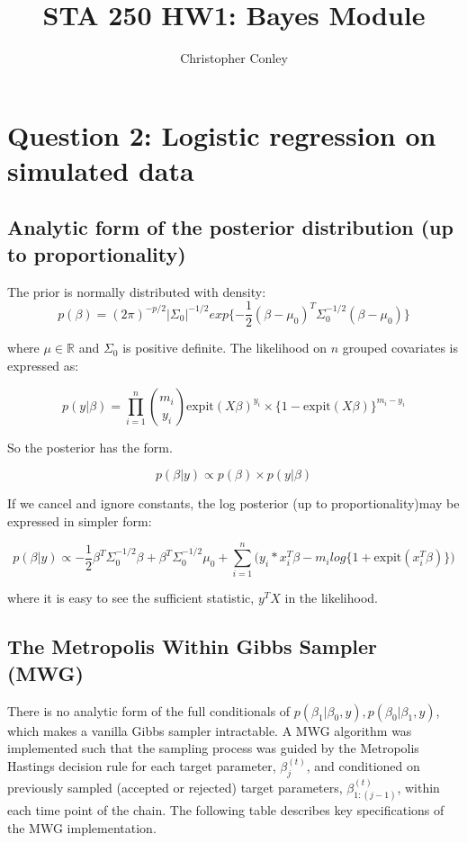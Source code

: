 \documentclass[11pt]{amsart}
\title{STA 250 HW1: Bayes Module}
\author{Christopher Conley}
\date{}                                           %
\begin{document}
\maketitle
\tableofcontents
\onehalfspacing

\section*{Question 2: Logistic regression on simulated data}
\subsection*{Analytic form of the posterior distribution (up to proportionality)}

The prior is normally distributed with density: 
\[ p( \beta)  = (2\pi)^{-p/2} |\Sigma_0| ^ {-1/2}  exp \{ -\frac{1}{2}  (\beta - \mu_0)^T \Sigma_0^{-1/2}  (\beta - \mu_0) \}\]

where $\mu \in \mathbb{R} $ and $\Sigma_0$ is positive definite. The likelihood on $n$ grouped covariates is expressed as:

\[ p( y | \beta ) = \prod_{i = 1}^n \binom{m_i}{y_i} \text{expit}( X \beta)^{y_i} \times \{1 - \text{expit}( X \beta) \}^{m_i - y_i} \]

So the posterior has the form.

\[ p( \beta | y) \propto p (\beta) \times p(y | \beta ) \]

If we cancel and ignore constants, the log posterior (up to proportionality)may be expressed in simpler form: 

\[ p( \beta | y) \propto -\frac{1}{2} \beta^T \Sigma_0^{-1/2} \beta + \beta^T \Sigma_0^{-1/2} \mu_0 + 
                                        \sum_{i = 1}^n \Big( y_i * x_i^T \beta - m_i log \{ 1 +   \text{expit}( x_i^T \beta) \} \Big )  \]

where it is easy to see the sufficient statistic, $y^TX$ in the likelihood. 

\subsection*{The Metropolis Within Gibbs Sampler (MWG)}

There is no analytic form of the full conditionals of $p( \beta_1 | \beta_0, y), p( \beta_0 | \beta_1, y)$, which makes a vanilla Gibbs sampler intractable.  A MWG algorithm was implemented such that the sampling process was guided by the Metropolis Hastings decision rule for each target parameter,  $\beta^{(t)}_j$, and conditioned on previously sampled (accepted or rejected) target parameters, $\beta^{(t)}_{1:(j - 1)}$, within each time point of the chain.  The following table describes key specifications of the MWG implementation. 
\end{document}

